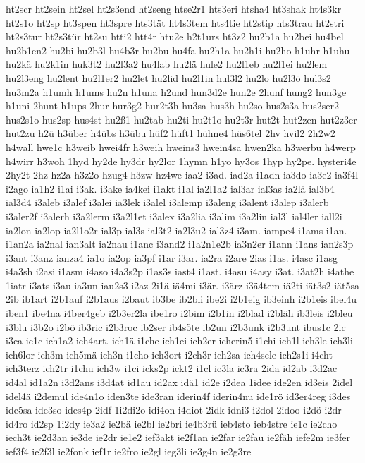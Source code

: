 {ht2scr
ht2sein
ht2sel
ht2s3end
ht2seng
htse2r1
hts3eri
htsha4
ht3shak
ht4s3kr
ht2s1o
ht2sp
ht3spen
ht3spre
hts3tät
ht4s3tem
hts4tie
ht2stip
hts3trau
ht2stri
ht2s3tur
ht2s3tür
ht2su
htti2
htt4r
htu2e
h2t1urs
ht3z2
hu2b1a
hu2bei
hu4bel
hu2b1en2
hu2bi
hu2b3l
hu4b3r
hu2bu
hu4fa
hu2h1a
hu2h1i
hu2ho
h1uhr
h1uhu
hu2kä
hu2k1in
huk3t2
hu2l3a2
hu4lab
hu2lä
hule2
hu2l1eb
hu2l1ei
hu2lem
hu2l3eng
hu2lent
hu2l1er2
hu2let
hu2lid
hu2l1in
hul3l2
hu2lo
hu2l3ö
hul3s2
hu3m2a
h1umh
h1ums
hu2n
h1una
h2und
hun3d2e
hun2e
2hunf
hung2
hun3ge
h1uni
2hunt
h1ups
2hur
hur3g2
hur2t3h
hu3sa
hus3h
hu2so
hus2s3a
hus2ser2
hus2s1o
hus2sp
hus4st
hu2ß1
hu2tab
hu2ti
hu2t1o
hu2t3r
hut2t
hut2zen
hut2z3er
hut2zu
h2ü
h3über
h4übs
h3übu
hüf2
hüft1
hühne4
hüs6tel
2hv
hvil2
2h2w2
h4wall
hwe1c
h3weib
hwei4fr
h3weih
hweins3
hwein4sa
hwen2ka
h3werbu
h4werp
h4wirr
h3woh
1hyd
hy2de
hy3dr
hy2lor
1hymn
h1yo
hy3os
1hyp
hy2pe.
hysteri4e
2hy2t
2hz
hz2a
h3z2o
hzug4
h3zw
hz4we
iaa2
i3ad.
iad2a
i1adn
ia3do
ia3e2
ia3f4l
i2ago
ia1h2
i1ai
i3ak.
i3ake
ia4kei
i1akt
i1al
ia2l1a2
ial3ar
ial3as
ia2lä
ial3b4
ial3d4
i3aleb
i3alef
i3alei
ia3lek
i3alel
i3alemp
i3aleng
i3alent
i3alep
i3alerb
i3aler2f
i3alerh
i3a2lerm
i3a2l1et
i3alex
i3a2lia
i3alim
i3a2lin
ial3l
ial4ler
iall2i
ia2lon
ia2lop
ia2l1o2r
ial3p
ial3s
ial3t2
ia2l3u2
ial3z4
i3am.
iampe4
i1ams
i1an.
i1an2a
ia2nal
ian3alt
ia2nau
i1anc
i3and2
i1a2n1e2b
ia3n2er
i1ann
i1ans
ian2s3p
i3ant
i3anz
ianza4
ia1o
ia2op
ia3pf
i1ar
i3ar.
ia2ra
i2are
2ias
i1as.
i4asc
i1asg
i4a3sh
i2asi
i1asm
i4aso
i4a3s2p
i1as3s
iast4
i1ast.
i4asu
i4asy
i3at.
i3at2h
i4athe
1iatr
i3ats
i3au
ia3un
iau2s3
i2az
2i1ä
iä4mi
i3är.
i3ärz
i3ä4tem
iä2ti
iät3s2
iät5sa
2ib
ib1art
i2b1auf
i2b1aus
i2baut
ib3be
ib2bli
ibe2i
i2b1eig
ib3einh
i2b1eis
ibel4u
iben1
ibe4na
i4ber4geb
i2b3er2la
ibe1ro
i2bim
i2b1in
i2blad
i2bläh
ib3leis
i2bleu
i3blu
i3b2o
i2bö
ib3ric
i2b3roc
ib2ser
ib4s5te
ib2un
i2b3unk
i2b3unt
ibus1c
2ic
i3ca
ic1c
ich1a2
ich4art.
ich1ä
i1che
ich1ei
ich2er
icherin5
i1chi
ich1l
ich3le
ich3li
ich6lor
ich3m
ich5mä
ich3n
i1cho
ich3ort
i2ch3r
ich2sa
ich4sele
ich2s1i
i4cht
ich3terz
ich2tr
i1chu
ich3w
i1ci
icks2p
ickt2
i1cl
ic3la
ic3ra
2ida
id2ab
i3d2ac
id4al
id1a2n
i3d2ans
i3d4at
id1au
id2ax
idä1
id2e
i2dea
1idee
ide2en
id3eis
2idel
idel4ä
i2demul
ide4n1o
iden3te
ide3ran
iderin4f
iderin4nu
ide1rö
id3er4reg
i3des
ide5sa
ide3so
ides4p
2idf
1i2di2o
idi4on
i4diot
2idk
idni3
i2dol
2idoo
i2dö
i2dr
id4ro
id2sp
1i2dy
ie3a2
ie2bä
ie2bl
ie2bri
ie4b3rü
ieb4sto
ieb4stre
ie1c
ie2cho
iech3t
ie2d3an
ie3de
ie2dr
ie1e2
ief3akt
ie2f1an
ie2far
ie2fau
ie2fäh
iefe2m
ie3fer
ief3f4
ie2f3l
ie2fonk
ief1r
ie2fro
ie2gl
ieg3li
ie3g4n
ie2g3re
}
